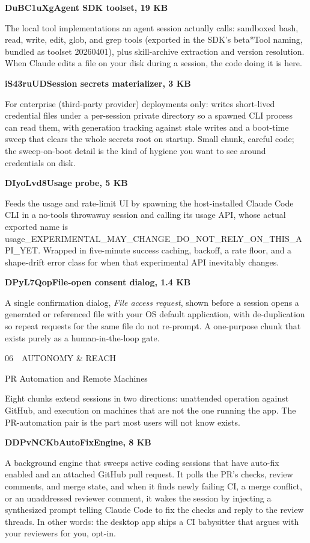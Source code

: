 \documentclass[11pt]{article}
\newcommand{\mono}{\ttfamily}
\newcommand{\reppar}[1]{{\fontsize{10.5}{15.2}\selectfont #1\par}\vspace{8pt}}
\newcommand{\code}[1]{{\mono\small #1}}
\newcommand{\reportsection}[3]{%
  \vspace{14pt}%
  {\mono\footnotesize\color{baseMid}\addfontfeatures{LetterSpace=8.0}\MakeUppercase{#1\, \textbullet\, #2}}\par
  \vspace{3pt}%
  {\heavy\fontsize{17}{19}\selectfont\color{base900} #3\par}
  \vspace{4pt}{\color{accent}\hrule height 1.6pt}\vspace{9pt}%
}
\newcommand{\chunkhead}[2]{%
  \vspace{4pt}%
  {\fontsize{10.5}{15.2}\selectfont
   {\mono\bfseries\color{accentink}#1}\;\textbullet\;\textbf{#2}\par}
  \vspace{2pt}}
\begin{document}
\chunkhead{DuBC1uXg}{Agent SDK toolset, 19 KB}
\reppar{The local tool implementations an agent session actually calls: sandboxed bash, read, write, edit, glob, and grep tools (exported in the SDK's \code{beta*Tool} naming, bundled as toolset \code{20260401}), plus skill-archive extraction and version resolution. When Claude edits a file on your disk during a session, the code doing it is here.}

\chunkhead{iS43ruUD}{Session secrets materializer, 3 KB}
\reppar{For enterprise (third-party provider) deployments only: writes short-lived credential files under a per-session private directory so a spawned CLI process can read them, with generation tracking against stale writes and a boot-time sweep that clears the whole secrets root on startup. Small chunk, careful code; the sweep-on-boot detail is the kind of hygiene you want to see around credentials on disk.}

\chunkhead{DIyoLvd8}{Usage probe, 5 KB}
\reppar{Feeds the usage and rate-limit UI by spawning the host-installed Claude Code CLI in a no-tools throwaway session and calling its usage API, whose actual exported name is \code{usage\_EXPERIMENTAL\_MAY\_CHANGE\_DO\_NOT\_RELY\_ON\_THIS\_API\_YET}. Wrapped in five-minute success caching, backoff, a rate floor, and a shape-drift error class for when that experimental API inevitably changes.}

\chunkhead{DPyL7Qop}{File-open consent dialog, 1.4 KB}
\reppar{A single confirmation dialog, \textit{File access request}, shown before a session opens a generated or referenced file with your OS default application, with de-duplication so repeat requests for the same file do not re-prompt. A one-purpose chunk that exists purely as a human-in-the-loop gate.}

\reportsection{06}{Autonomy \& Reach}{PR Automation and Remote Machines}

\reppar{Eight chunks extend sessions in two directions: unattended operation against GitHub, and execution on machines that are not the one running the app. The PR-automation pair is the part most users will not know exists.}

\chunkhead{DDPvNCKb}{AutoFixEngine, 8 KB}
\reppar{A background engine that sweeps active coding sessions that have auto-fix enabled and an attached GitHub pull request. It polls the PR's checks, review comments, and merge state, and when it finds newly failing CI, a merge conflict, or an unaddressed reviewer comment, it wakes the session by injecting a synthesized \code{<ci-monitor-event>} prompt telling Claude Code to fix the checks and reply to the review threads. In other words: the desktop app ships a CI babysitter that argues with your reviewers for you, opt-in.}
\end{document}
